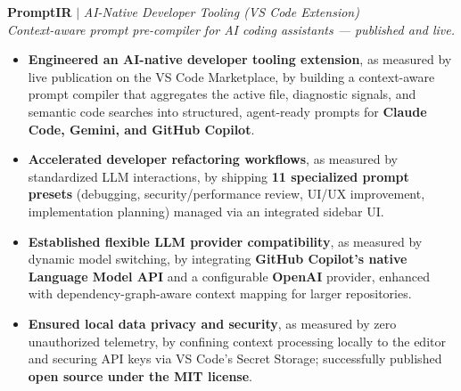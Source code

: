 \documentclass[10pt,letterpaper]{article}
\newenvironment{highlights}{
  \begin{itemize}[topsep=2pt,parsep=1pt,partopsep=0pt,itemsep=0pt,leftmargin=10pt]
}{\end{itemize}}
\begin{document}
\textbf{PromptIR} $|$ \textit{AI-Native Developer Tooling (VS Code Extension)}
\hfill
\href{https://marketplace.visualstudio.com/items?itemName=HabibUllahYeasin.promptir}{\textcolor{myblue}{\faExternalLink*}}
\href{https://github.com/H-Yeasin/promptIR}{\textcolor{myblue}{\faGithub}}\\
\textit{Context-aware prompt pre-compiler for AI coding assistants --- published and live.}
\begin{highlights}
  \item \textbf{Engineered an AI-native developer tooling extension}, as measured by live publication on the VS Code Marketplace, by building a context-aware prompt compiler that aggregates the active file, diagnostic signals, and semantic code searches into structured, agent-ready prompts for \textbf{Claude Code, Gemini, and GitHub Copilot}.
  \item \textbf{Accelerated developer refactoring workflows}, as measured by standardized LLM interactions, by shipping \textbf{11 specialized prompt presets} (debugging, security/performance review, UI/UX improvement, implementation planning) managed via an integrated sidebar UI.
  \item \textbf{Established flexible LLM provider compatibility}, as measured by dynamic model switching, by integrating \textbf{GitHub Copilot's native Language Model API} and a configurable \textbf{OpenAI} provider, enhanced with dependency-graph-aware context mapping for larger repositories.
  \item \textbf{Ensured local data privacy and security}, as measured by zero unauthorized telemetry, by confining context processing locally to the editor and securing API keys via VS Code's Secret Storage; successfully published \textbf{open source under the MIT license}.
\end{highlights}

\vspace{3pt}
\end{document}
